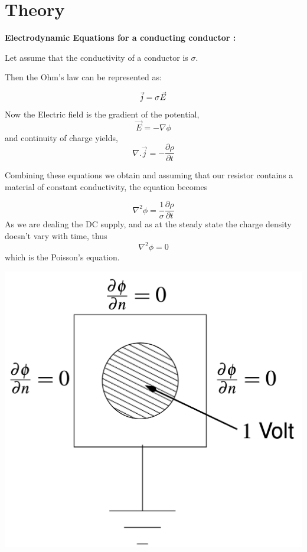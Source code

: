 \documentclass[10pt,english, openany]{book}
\begin{document}
\endgroup
\chapter{Theory}
\large{\textbf{Electrodynamic Equations for a conducting conductor :}}\par

Let assume that the conductivity of a conductor is $\sigma$. \par
Then the Ohm's law can be represented as:\par
\begin{equation*}
\vec{j}=\sigma \vec{E}\\
\end{equation*}
Now the Electric field is the gradient of the potential,
\begin{equation*}
\vec{E} = − \nabla \phi 
\end{equation*}
and continuity of charge yields,
\begin{equation*}
\nabla . \vec{j} = − \frac{\partial \rho}{\partial t} 
\end{equation*}

Combining these equations we obtain and assuming that our resistor contains a material of constant conductivity, the equation becomes

\begin{equation*}
{\nabla}^{2}\phi = \frac{1}{\sigma}\frac{\partial\rho}{\partial t}
\end{equation*}
As we are dealing the DC supply, and as at the steady state the charge density doesn't vary with time, thus
\begin{equation*}
{\nabla}^{2}\phi =0
\end{equation*}which is the Poisson's equation.\par

\begin{center}
\includegraphics[scale=0.2]{plate.png}
\end{center}
\end{document}
